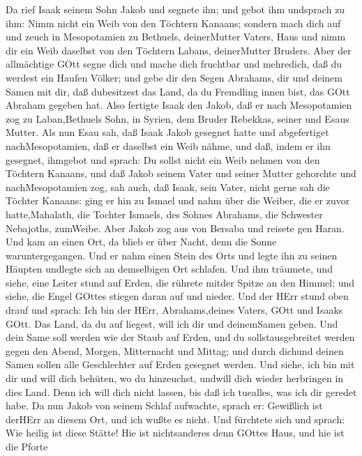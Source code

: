  Da rief Isaak seinem Sohn Jakob und segnete ihn; und gebot
ihm undsprach zu ihm: Nimm nicht ein Weib von den Töchtern Kanaans;
 sondern mach dich auf und zeuch in Mesopotamien zu
Bethuels, deinerMutter Vaters, Haus und nimm dir ein Weib daselbst von
den Töchtern Labans, deinerMutter Bruders.  Aber der
allmächtige GOtt segne dich und mache dich fruchtbar und mehredich, daß
du werdest ein Haufen Völker;  und gebe dir den Segen
Abrahams, dir und deinem Samen mit dir, daß dubesitzest das Land, da du
Fremdling innen bist, das GOtt Abraham gegeben hat.  Also
fertigte Isaak den Jakob, daß er nach Mesopotamien zog zu Laban,Bethuels
Sohn, in Syrien, dem Bruder Rebekkas, seiner und Esaus Mutter.
 Als nun Esau sah, daß Isaak Jakob gesegnet hatte und
abgefertiget nachMesopotamien, daß er daselbst ein Weib nähme, und daß,
indem er ihn gesegnet, ihmgebot und sprach: Du sollst nicht ein Weib
nehmen von den Töchtern Kanaans,  und daß Jakob seinem Vater
und seiner Mutter gehorchte und nachMesopotamien zog,  sah
auch, daß Isaak, sein Vater, nicht gerne sah die Töchter Kanaans:
 ging er hin zu Ismael und nahm über die Weiber, die er
zuvor hatte,Mahalath, die Tochter Ismaels, des Sohnes Abrahams, die
Schwester Nebajoths, zumWeibe.  Aber Jakob zog aus von
Bersaba und reisete gen Haran.  Und kam an einen Ort, da
blieb er über Nacht, denn die Sonne waruntergegangen. Und er nahm einen
Stein des Orts und legte ihn zu seinen Häupten undlegte sich an
demselbigen Ort schlafen.  Und ihm träumete, und siehe,
eine Leiter stund auf Erden, die rührete mitder Spitze an den Himmel;
und siehe, die Engel GOttes stiegen daran auf und nieder. 
Und der HErr stund oben drauf und sprach: Ich bin der HErr,
Abrahams,deines Vaters, GOtt und Isaaks GOtt. Das Land, da du auf
liegest, will ich dir und deinemSamen geben.  Und dein Same
soll werden wie der Staub auf Erden, und du sollstausgebreitet werden
gegen den Abend, Morgen, Mitternacht und Mittag; und durch dichund
deinen Samen sollen alle Geschlechter auf Erden gesegnet werden.
 Und siehe, ich bin mit dir und will dich behüten, wo du
hinzeuchst, undwill dich wieder herbringen in dies Land. Denn ich will
dich nicht lassen, bis daß ich tuealles, was ich dir geredet habe.
 Da nun Jakob von seinem Schlaf aufwachte, sprach er:
Gewißlich ist derHErr an diesem Ort, und ich wußte es nicht.
 Und fürchtete sich und sprach: Wie heilig ist diese
Stätte! Hie ist nichtsanderes denn GOttes Haus, und hie ist die Pforte
